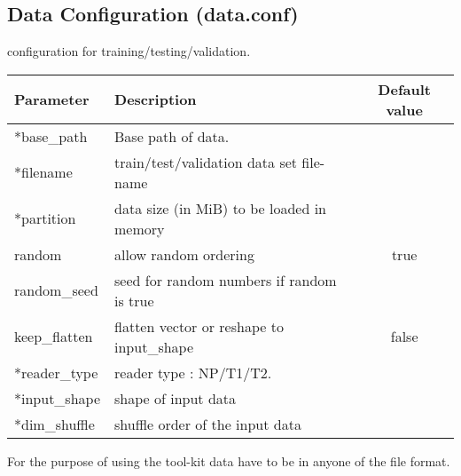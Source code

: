 \subsection{Data Configuration (data.conf)}
\begin{table}[h]
\begin{center}
  \medskip  \small configuration for training/testing/validation.
   \begin{tabular}{|l|p{8cm}|c|} \hline
\textbf{Parameter}	& \textbf{Description} 				& \textbf{Default value}\\  \hline \hline
 	*base\_path & Base path of data. &  \\  \hline
   	*filename &  train/test/validation data set file-name & \\  \hline
	*partition & data size (in MiB) to be loaded in memory & \\  \hline
	random & allow random ordering  & true \\  \hline
	random\_seed & seed for random numbers if random is true & \\  \hline 
	keep\_flatten & flatten vector or reshape to input\_shape & false \\  \hline
	*reader\_type & reader type : NP/T1/T2. & \\  \hline		
	*input\_shape & shape of input data & \\  \hline
	*dim\_shuffle &  shuffle order of the input data &  \\ \hline
  \end{tabular}		
\end{center}
\end{table} 
\noindent For the purpose of using the tool-kit data have to be in anyone of the file format.

